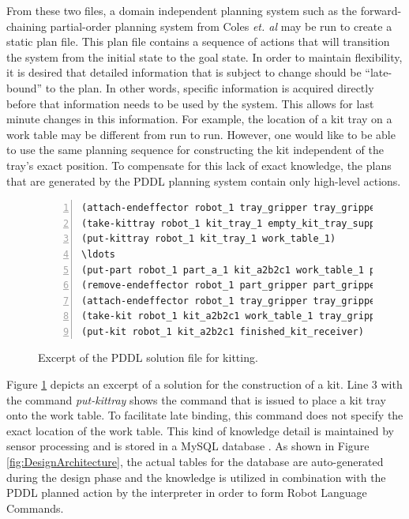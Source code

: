 From these two files, a domain independent planning system such as
the forward-chaining partial-order planning system from Coles \textit{et. al}
\cite{Coles.ICAPS.2010} may be run to create a static plan file. This
plan file contains a sequence of actions that will transition the
system from the initial state to the goal state.
In order to maintain flexibility, it is desired that detailed information
that is subject to change should be ``late-bound'' to the plan.
In other words, specific information is acquired directly before that
information needs to be used by the system.
This allows for last minute changes in this information. For example,
the location of a kit tray on a work table may be different from run to run.
However, one would like to be able to use the same planning sequence for
constructing the kit independent of the tray's exact position.
To compensate for this lack of exact knowledge, the plans that are
generated by the PDDL planning system contain only high-level actions.
\begin{figure}[t!h!]
\begin{minipage}{.5\paperwidth}
\begin{list}{}{\setlength{\leftmargin}{1em}}\item\small
\begin{Verbatim}[commandchars=\\\{\},fontsize=\scriptsize, numbers=left, numbersep=2pt]
(attach-endeffector robot_1 tray_gripper tray_gripper_holder changing_station_1)
(take-kittray robot_1 kit_tray_1 empty_kit_tray_supply tray_gripper work_table_1)
(put-kittray robot_1 kit_tray_1 work_table_1)
\ldots
(put-part robot_1 part_a_1 kit_a2b2c1 work_table_1 part_a_tray)
(remove-endeffector robot_1 part_gripper part_gripper_holder changing_station_1)
(attach-endeffector robot_1 tray_gripper tray_gripper_holder changing_station_1)
(take-kit robot_1 kit_a2b2c1 work_table_1 tray_gripper)
(put-kit robot_1 kit_a2b2c1 finished_kit_receiver)
\end{Verbatim}
\end{list}
\end{minipage}
\caption{Excerpt of the PDDL solution file for kitting.}
\label{fig:Solution}
\end{figure}

Figure \ref{fig:Solution} depicts an excerpt of a solution for
the construction of a kit. Line 3 with the command \textsl{put-kittray}
shows the command that is issued to place
a kit tray onto the work table. To facilitate late binding, this
command does not specify the exact location of the work table.
This kind of knowledge detail is maintained by sensor processing
and is stored in a MySQL database \cite{MySQL}. As shown
in Figure \ref{fig:DesignArchitecture}, the actual tables
for the database are auto-generated during the design phase and the
knowledge is utilized in combination with the PDDL planned action by
the interpreter in order to form Robot Language Commands.


